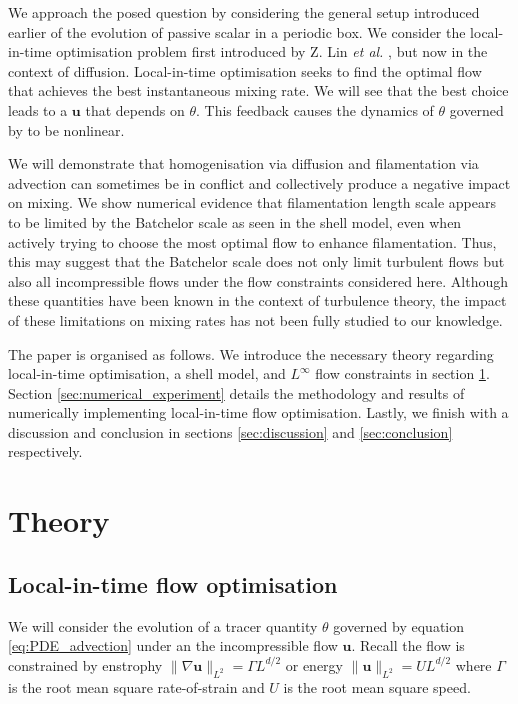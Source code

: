 \documentclass[12pt]{iopart}
\newcommand{\ltwo}[1]{\|#1\|_{L^{2}}}
\renewcommand{\vec}[1]{\mathbf{#1}}
\renewcommand{\u}{\mathbf{u}}
\begin{document}
We approach the posed question by considering the general setup introduced earlier of the evolution of passive scalar in a periodic box. We consider the local-in-time optimisation problem first introduced by Z. Lin {\it et al.} \cite{JFM2011}, but now in the context of diffusion. Local-in-time optimisation seeks to find the optimal flow that achieves the best instantaneous mixing rate. We will see that the best choice leads to a $\vec{u}$ that depends on $\theta$. This feedback causes the dynamics of $\theta$ governed by  to be nonlinear.

We will demonstrate that homogenisation via diffusion and filamentation via advection can sometimes be in conflict and collectively produce a negative impact on mixing. We show numerical evidence that filamentation length scale appears to be limited by the Batchelor scale as seen in the shell model, even when actively trying to choose the most optimal flow to enhance filamentation. Thus, this may suggest that the Batchelor scale does not only limit turbulent flows but also all incompressible flows under the flow constraints considered here. Although these quantities have been known in the context of turbulence theory, the impact of these limitations on mixing rates has not been fully studied to our knowledge.


The paper is organised as follows. We introduce the necessary theory regarding local-in-time optimisation, a shell model, and $L^{\infty}$ flow constraints in section \ref{sec:theory}. Section \ref{sec:numerical_experiment} details the methodology and results of numerically implementing local-in-time flow optimisation. Lastly, we finish with a discussion and conclusion in sections \ref{sec:discussion} and \ref{sec:conclusion} respectively.





\section{Theory}
\label{sec:theory}
\subsection{Local-in-time flow optimisation}

We will consider the evolution of a tracer quantity $\theta$ governed by equation \ref{eq:PDE_advection} under an the incompressible flow $\vec{u}$.  Recall the flow is constrained by enstrophy $\ltwo{\nabla\u} = \Gamma L^{d/2}$ or energy $\ltwo{\u} = UL^{d/2}$ where $\Gamma$ is the root mean square rate-of-strain and $U$ is the root mean square speed. 
\end{document}
